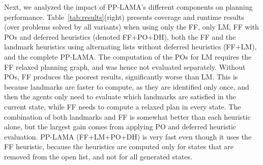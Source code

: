 \documentclass[letterpaper]{article}
\theoremstyle{definition}
\begin{document}
Next, we analyzed the impact of PP-LAMA's different components on planning performance. Table~\ref{tab:results}(right) presents coverage and runtime results (over problems solved by all variants) when using only the FF, only LM, FF with POs and deferred heuristics (denoted FF+PO+DH), both the FF and the landmark heuristics using alternating lists without deferred heuristics (FF+LM), and the complete PP-LAMA.
The computation of the POs for LM requires the FF relaxed planning graph, and was hence not evaluated separately.
Without POs, FF produces the poorest results, significantly worse than LM. This is because landmarks are faster to compute, as they are identified only once, and then the agents only need to evaluate which landmarks are satisfied in the current state, while FF needs to compute a relaxed plan in every state. The combination of both landmarks and FF is somewhat better than each heuristic alone, but the largest gain comes from applying PO and deferred heuristic evaluation. PP-LAMA (FF+LM+PO+DH) is very fast even though it uses the FF heuristic, because the heuristics are computed only for states that are removed from the open list, and not for all generated states.


\end{document}
